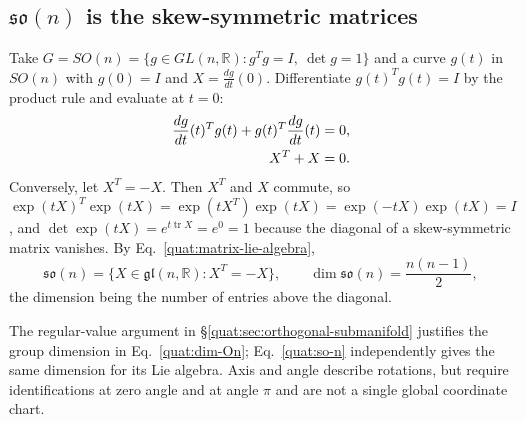 \subsection{\texorpdfstring{$\mathfrak{so}(n)$}{so(n)} is the skew-symmetric matrices}
Take $G=SO(n)=\{g\in GL(n,\mathbb R):g^Tg=I,\ \det g=1\}$ and a curve
$g(t)$ in $SO(n)$ with $g(0)=I$ and $X=\frac{dg}{dt}(0)$. Differentiate
$g(t)^Tg(t)=I$ by the product rule and evaluate at $t=0$:
\begin{align}
 \frac{dg}{dt}(t)^T g(t)+g(t)^T\frac{dg}{dt}(t)&=0,\notag\\
 X^T+X&=0 .\label{quat:skew}
\end{align}
Conversely, let $X^T=-X$. Then $X^T$ and $X$ commute, so
$\exp(tX)^T\exp(tX)=\exp(tX^T)\exp(tX)=\exp(-tX)\exp(tX)=I$, and
$\det\exp(tX)=e^{t\operatorname{tr}X}=e^0=1$ because the diagonal of a
skew-symmetric matrix vanishes. By Eq.~\eqref{quat:matrix-lie-algebra},
\begin{equation}\label{quat:so-n}
 \mathfrak{so}(n)=\{X\in\mathfrak{gl}(n,\mathbb R):X^T=-X\},\qquad
 \dim\mathfrak{so}(n)=\frac{n(n-1)}{2},
\end{equation}
the dimension being the number of entries above the diagonal.

The regular-value argument in
\S\ref{quat:sec:orthogonal-submanifold} justifies the group dimension
in Eq.~\eqref{quat:dim-On}; Eq.~\eqref{quat:so-n} independently gives
the same dimension for its Lie algebra. Axis and angle describe rotations,
but require identifications at zero angle and at angle $\pi$ and are not
a single global coordinate chart.

